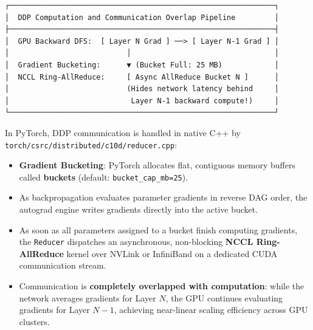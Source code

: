 \documentclass[
  letterpaper,
]{scrbook}
\providecommand{\tightlist}{%
  \setlength{\itemsep}{0pt}\setlength{\parskip}{0pt}}
\begin{document}
\begin{verbatim}
┌─────────────────────────────────────────────────────────────┐
│  DDP Computation and Communication Overlap Pipeline         │
├─────────────────────────────────────────────────────────────┤
│  GPU Backward DFS:  [ Layer N Grad ] ──> [ Layer N-1 Grad ] │
│                           │                                 │
│  Gradient Bucketing:      ▼ (Bucket Full: 25 MB)            │
│  NCCL Ring-AllReduce:     [ Async AllReduce Bucket N ]      │
│                           (Hides network latency behind     │
│                            Layer N-1 backward compute!)     │
└─────────────────────────────────────────────────────────────┘
\end{verbatim}

\begin{tcolorbox}[enhanced jigsaw, arc=.35mm, bottomrule=.15mm, bottomtitle=1mm, breakable, colback=white, colbacktitle=quarto-callout-note-color!10!white, colframe=quarto-callout-note-color-frame, coltitle=black, left=2mm, leftrule=.75mm, opacityback=0, opacitybacktitle=0.6, rightrule=.15mm, title=\textcolor{quarto-callout-note-color}{\faInfo}\hspace{0.5em}{PyTorch Systems Bridge: DDP Gradient Bucketing in C++}, titlerule=0mm, toprule=.15mm, toptitle=1mm]

In PyTorch, DDP communication is handled in native C++ by
\texttt{torch/csrc/distributed/c10d/reducer.cpp}:

\begin{itemize}
\tightlist
\item
  \textbf{Gradient Bucketing}: PyTorch allocates flat, contiguous memory
  buffers called \textbf{buckets} (default:
  \texttt{bucket\_cap\_mb=25}).
\item
  As backpropagation evaluates parameter gradients in reverse DAG order,
  the autograd engine writes gradients directly into the active bucket.
\item
  As soon as all parameters assigned to a bucket finish computing
  gradients, the \texttt{Reducer} dispatches an asynchronous,
  non-blocking \textbf{NCCL Ring-AllReduce} kernel over NVLink or
  InfiniBand on a dedicated CUDA communication stream.
\item
  Communication is \textbf{completely overlapped with computation}:
  while the network averages gradients for Layer \(N\), the GPU
  continues evaluating gradients for Layer \(N-1\), achieving
  near-linear scaling efficiency across GPU clusters.\footnotemark{}
\end{itemize}

\end{tcolorbox}
\end{document}
